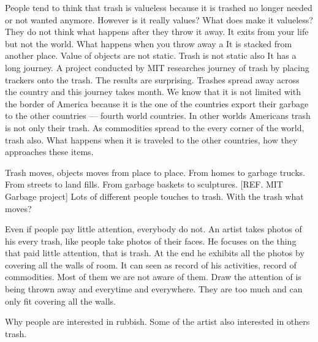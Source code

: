 People tend to think that trash is valueless because it is trashed no longer needed or not wanted anymore. However is it really values? What does make it valueless? They do not think what happens after they throw it away. It exits from your life but not the world. What happens when you throw away a It is stacked from another place. Value of objects are not static. Trash is not static also It has a long journey. A project conducted by MIT researches journey of trash by placing trackers onto the trash. The results are surprising. Trashes spread away across the country and this journey takes month.  We know that it is not limited with the border of America because it is the one of the countries export their garbage to the other countries --- fourth world countries. In other worlds Americans trash is not only their trash. As commodities spread to the every corner of the world, trash also. What happens when it is traveled to the other countries, how they approaches these items.  

Trash moves, objects moves from place to place. From homes to garbage trucks. From streets to land fills. From garbage baskets to sculptures. [REF. MIT Garbage project] Lots of different people touches to trash. With the trash what moves?

Even if people pay little attention, everybody do not. An artist takes photos of his every trash, like people take photos of their faces. He focuses on the thing that paid little attention, that is trash. At the end he exhibits all the photos by covering all the walls of room. It can seen as record of his activities, record of commodities. Most of them we are not aware of them. Draw the attention of is being thrown away and everytime and everywhere. They are too much and can only fit covering all the walls. 


Why people are interested in rubbish. Some of the artist also interested in others trash. 

